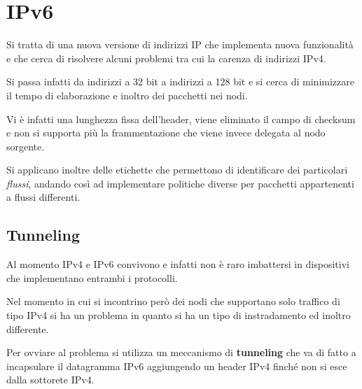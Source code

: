 \section{IPv6}
Si tratta di una nuova versione di indirizzi IP che implementa nuova
funzionalità e che cerca di risolvere alcuni problemi tra cui la 
carenza di indirizzi IPv4.

Si passa infatti da indirizzi a 32 bit a indirizzi a 128 bit e si cerca
di minimizzare il tempo di elaborazione e inoltro dei pacchetti nei
nodi.

Vi è infatti una lunghezza fissa dell'header, viene eliminato il
campo di checksum e non si supporta più la frammentazione che viene 
invece delegata al nodo sorgente.

Si applicano inoltre delle etichette che permettono di identificare 
dei particolari \emph{flussi}, andando così ad implementare politiche
diverse per pacchetti appartenenti a flussi differenti.

\subsection{Tunneling}
Al momento IPv4 e IPv6 convivono e infatti non è raro imbattersi in
dispositivi che implementano entrambi i protocolli.

Nel momento in cui si incontrino però dei nodi che supportano solo 
traffico di tipo IPv4 si ha un problema in quanto si ha un tipo di 
instradamento ed inoltro differente.

Per ovviare al problema si utilizza un meccanismo di \textbf{tunneling}
che va di fatto a incapsulare il datagramma IPv6 aggiungendo un header
IPv4 finché non si esce dalla sottorete IPv4.

